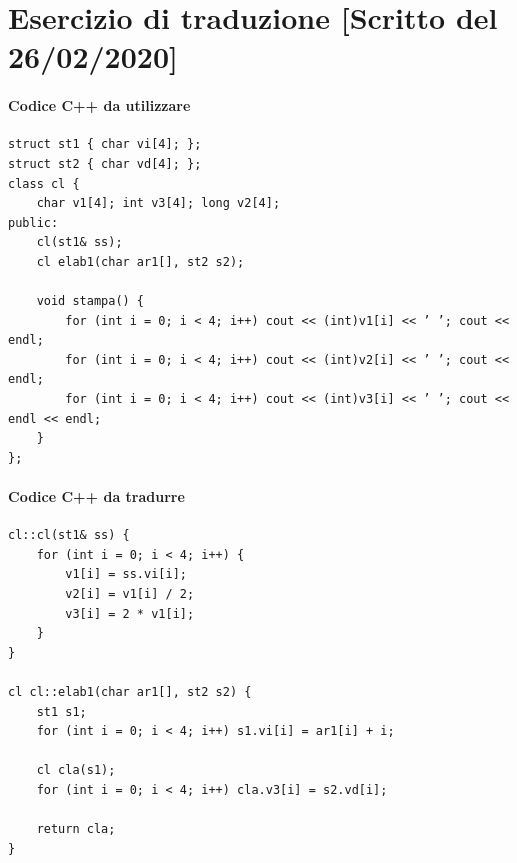 \documentclass[11pt]{report}
\theoremstyle{definition}
\begin{document}
\section{Esercizio di traduzione [Scritto del 26/02/2020]}
\begingroup
\small
\begin{framed}
\paragraph{Codice C++ da utilizzare}
\begin{verbatim}
struct st1 { char vi[4]; };
struct st2 { char vd[4]; };
class cl {
    char v1[4]; int v3[4]; long v2[4];
public:
    cl(st1& ss);
    cl elab1(char ar1[], st2 s2);   
    
    void stampa() {
        for (int i = 0; i < 4; i++) cout << (int)v1[i] << ’ ’; cout << endl;
        for (int i = 0; i < 4; i++) cout << (int)v2[i] << ’ ’; cout << endl;
        for (int i = 0; i < 4; i++) cout << (int)v3[i] << ’ ’; cout << endl << endl;
    }
};
\end{verbatim}
\paragraph{Codice C++ da tradurre}
\begin{verbatim}
cl::cl(st1& ss) {
    for (int i = 0; i < 4; i++) {
        v1[i] = ss.vi[i]; 
        v2[i] = v1[i] / 2;
        v3[i] = 2 * v1[i];
    }
}

cl cl::elab1(char ar1[], st2 s2) {
    st1 s1;
    for (int i = 0; i < 4; i++) s1.vi[i] = ar1[i] + i;
    
    cl cla(s1);
    for (int i = 0; i < 4; i++) cla.v3[i] = s2.vd[i];
    
    return cla;
}
\end{verbatim}
\end{framed}
\end{document}
